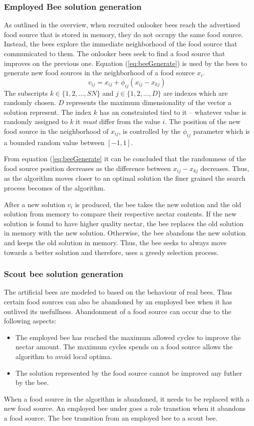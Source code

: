 \subsubsection{Employed Bee solution generation}
As outlined in the overview, when recruited onlooker bees reach the advertised food source that is stored in memory, they do not occupy the same food source. Instead, the bees explore the immediate neighborhood of the food source that communicated to them. The onlooker bees seek to find a food source that improves on the previous one. Equation (\ref{eq:beeGenerate}) is used by the bees to generate new food sources in the neighborhood of a food source $x_i$.
\begin{equation}
\label{eq:beeGenerate}
v_{ij} = x_{ij} + \phi_{ij}(x_{ij} - x_{kj})
\end{equation}
The subscripts $k \in \{1,2,\dots,SN\}$ and $j \in \{1,2,\dots,D\}$ are indexes which are randomly chosen. $D$ represents the maximum dimensionality of the vector a solution represent. The index $k$ has an constrainted tied to it -- whatever value is randomly assigned to $k$ it \emph{must} differ from the value $i$. The position of the new food source in the neighborhood of $x_{ij}$, is controlled by the $\phi_{ij}$ parameter which is a bounded random value between $[-1,1]$. 

From equation (\ref{eq:beeGenerate} it can be concluded that the randomness of the food source position decreases as the difference between $x_{ij} - x_{kj}$ decreases. Thus, as the algorithm moves closer to an optimal solution the finer grained the search process becomes of the algorithm.

After a new solution $v_i$ is produced, the bee takes the new solution and the old solution from memory to compare their respective nectar contents. If the new solution is found to have higher quality nectar, the bee replaces the old solution in memory with the new solution. Otherwise, the bee abandons the new solution and keeps the old solution in memory. Thus, the bee seeks to always move towards a better solution and therefore, uses a greedy selection process.

\subsubsection{Scout bee solution generation}
The artificial bees are modeled to based on the behaviour of real bees. Thus certain food sources can also be abandoned by an employed bee when it has outlived its usefullness. Abandonment of a food source can occur due to the following aspects:
\begin{itemize}
\item The employed bee has reached the maximum allowed cycles to improve the nectar amount. The maximum cycles spends on a food source allows the algorithm to avoid local optima.
\item The solution represented by the food source cannot be improved any futher by the bee.
\end{itemize}
When a food source in the algorithm is abandoned, it needs to be replaced with a new food source. An employed bee under goes a role transtion when it abandons a food source. The bee transition from an employed bee to a scout bee. 

